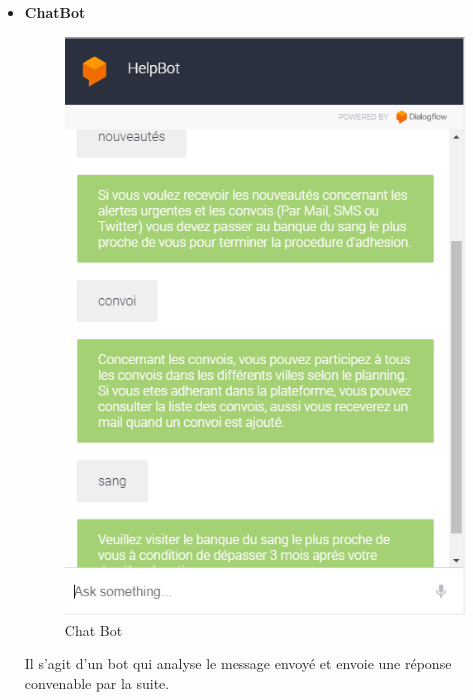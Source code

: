 \documentclass[12pt,a4paper,twoside]{report}
\begin{document}
{{\begin{itemize}
\begin{figure}[H]
									 \centering
									 \caption{\label{auth} Page d'authentification}
								\end{figure}
					Dans cette page, on saisit les informations relatives à la création de la session pour accéder à un espace selon le role.
					\newline
					\item \textbf{ChatBot}
					\begin{figure}[H]
									 \includegraphics[width=13cm]{Images/bot.png}
									 \centering
									 \caption{\label{bot} Chat Bot}
								\end{figure}
								Il s'agit d'un bot qui analyse le message envoyé et envoie une réponse convenable par la suite.
					
			\end{itemize}
		}
}
\end{document}
